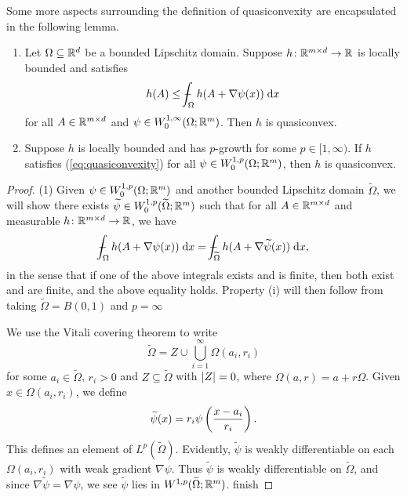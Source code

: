 Some more aspects surrounding the definition of quasiconvexity are encapsulated in the following lemma.
\begin{lemma} \label{lem:propertiesOfQuasiconvexity}
    \begin{enumerate}[label={\rm (\arabic*)}]
        \item Let $\Omega \subseteq \mathbb{R}^d$ be a bounded Lipschitz domain. Suppose $h \colon \mathbb{R}^{m \times d} \to \mathbb{R}$ is locally bounded and satisfies 
        \begin{equation} \label{eq:quasiconvexity}
            h(A) \leq \dashint_\Omega h(A + \nabla \psi(x)) \; \d x
        \end{equation}
        for all $A \in \mathbb{R}^{m \times d}$ and $\psi \in W_0^{1,\infty}(\Omega;\mathbb{R}^m)$. Then $h$ is quasiconvex.

        \item Suppose $h$ is locally bounded and has $p$-growth for some $p \in [1,\infty)$. If $h$ satisfies (\ref{eq:quasiconvexity}) for all $\psi \in W_0^{1,p}(\Omega;\mathbb{R}^m)$, then $h$ is quasiconvex.
    \end{enumerate}
\end{lemma}  
\begin{proof}
    (1) Given $\psi \in W_0^{1,p}(\Omega;\mathbb{R}^m)$ and another bounded Lipschitz domain $\widetilde{\Omega}$, we will show there exists $\widetilde{\psi} \in W_0^{1,p}(\widetilde{\Omega};\mathbb{R}^m)$ such that for all $A \in \mathbb{R}^{m \times d}$ and measurable $h \colon \mathbb{R}^{m \times d} \to \mathbb{R}$, we have 
    \begin{equation}
        \dashint_{\Omega} h(A + \nabla\psi(x)) \; \d x = \dashint_{\widetilde{\Omega}} h(A + \nabla\widetilde{\psi}(x)) \; \d x,
    \end{equation}
    in the sense that if one of the above integrals exists and is finite, then both exist and are finite, and the above equality holds. Property (i) will then follow from taking $\widetilde{\Omega} = B(0,1)$ and $p = \infty$

    We use the Vitali covering theorem to write 
    \begin{equation}
        \widetilde{\Omega} = Z \cup \bigcup_{i=1}^\infty \Omega(a_i,r_i)
    \end{equation}
    for some $a_i \in \widetilde{\Omega}$, $r_i > 0$ and $Z \subseteq \widetilde{\Omega}$ with $\left\lvert {Z} \right\rvert = 0$, where $\Omega(a,r) = a + r\Omega$. Given $x \in \Omega(a_i,r_i)$, we define 
    \begin{equation}
        \widetilde{\psi}(x) = r_i \psi\left( {\frac{x-a_i}{r_i}} \right).
    \end{equation}
    This defines an element of $L^p(\widetilde{\Omega})$. Evidently, $\widetilde{\psi}$ is weakly differentiable on each $\Omega(a_i,r_i)$ with weak gradient $\nabla\psi$. Thus $\widetilde{\psi}$ is weakly differentiable on $\widetilde{\Omega}$, and since $\nabla\widetilde{\psi} = \nabla\psi$, we see $\widetilde{\psi}$ lies in $W^{1,p}(\widetilde{\Omega};\mathbb{R}^m)$. 
    {\color{red} finish}  
\end{proof}

